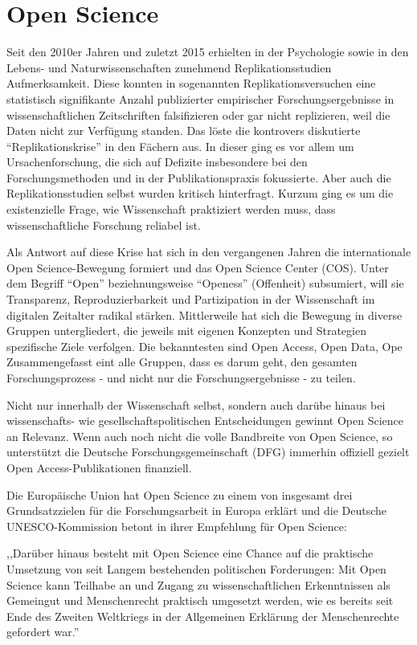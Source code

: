 \section{Open Science}

Seit den 2010er Jahren und zuletzt 2015 erhielten in der Psychologie sowie in den Lebens- und Naturwissenschaften zunehmend Replikationsstudien Aufmerksamkeit. Diese konnten in sogenannten Replikationsversuchen eine statistisch signifikante Anzahl publizierter empirischer Forschungsergebnisse in wissenschaftlichen Zeitschriften falsifizieren oder gar nicht replizieren, weil die Daten nicht zur Verfügung standen. Das löste die kontrovers diskutierte “Replikationskrise” in den Fächern aus. In dieser ging es vor allem um Ursachenforschung, die sich auf Defizite insbesondere bei den Forschungsmethoden und in der Publikationspraxis fokussierte. Aber auch die Replikationsstudien selbst wurden kritisch hinterfragt. Kurzum ging es um die existenzielle Frage, wie Wissenschaft praktiziert werden muss, dass wissenschaftliche Forschung reliabel ist.

Als Antwort auf diese Krise hat sich in den vergangenen Jahren die internationale Open Science-Bewegung formiert und das Open Science Center (COS). Unter dem Begriff “Open” beziehnungsweise “Openess” (Offenheit) subsumiert, will sie Transparenz, Reproduzierbarkeit und Partizipation in der Wissenschaft im digitalen Zeitalter radikal stärken. Mittlerweile hat sich die Bewegung in diverse Gruppen untergliedert, die jeweils mit eigenen Konzepten und Strategien spezifische Ziele verfolgen. Die bekanntesten sind Open Access, Open Data, Ope Zusammengefasst eint alle Gruppen, dass es darum geht, den gesamten Forschungsprozess - und nicht nur die Forschungsergebnisse - zu teilen. 

Nicht nur innerhalb der Wissenschaft selbst, sondern auch darübe hinaus bei wissenschafts- wie gesellschaftspolitischen Entscheidungen gewinnt Open Science an Relevanz. Wenn auch noch nicht die volle Bandbreite von Open Science, so unterstützt die Deutsche Forschungsgemeinschaft (DFG) immerhin offiziell gezielt Open Access-Publikationen finanziell. 

Die Europäische Union hat Open Science zu einem von insgesamt drei Grundsatzzielen für die Forschungsarbeit in Europa erklärt  und die  Deutsche UNESCO-Kommission betont in ihrer Empfehlung für Open Science:

,,Darüber hinaus besteht mit Open Science eine Chance auf die praktische Umsetzung von seit Langem bestehenden politischen Forderungen: Mit Open Science kann Teilhabe an und Zugang zu wissenschaftlichen Erkenntnissen als Gemeingut und Menschenrecht praktisch umgesetzt werden, wie es bereits seit Ende des Zweiten Weltkriegs in der Allgemeinen Erklärung der Menschenrechte gefordert war.''

